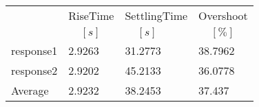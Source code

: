 \begin{tabular}{llll}
  & RiseTime & SettlingTime & Overshoot  \\ 
  & $\;\;\;\;[s]$ & $\;\;\;\;[s]$ & $\;\;\;\;[\%]$  \\ 
\hline 
response1 & 2.9263 & 31.2773 & 38.7962  \\ 
response2 & 2.9202 & 45.2133 & 36.0778 \\ 
Average & 2.9232 & 38.2453 & 37.437  \\ 
\hline 
\end{tabular}